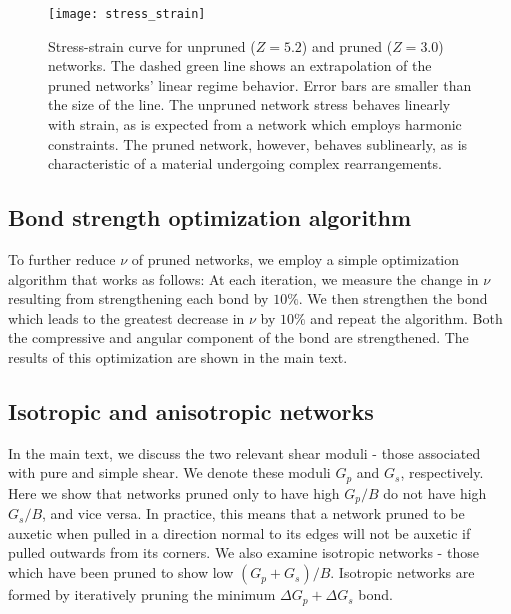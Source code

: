 \documentclass[9pt,twocolumn,twoside]{pnas-new}
\begin{document}
 \begin{figure}
	\centering
	\texttt{[image: stress\_strain]}
	\caption{Stress-strain curve for unpruned ($Z=5.2$) and pruned ($Z=3.0$)  networks.  The dashed green line shows an extrapolation of the pruned networks' linear regime behavior. Error bars are smaller than the size of the line.  The unpruned network stress behaves linearly with strain, as is expected from a network which employs harmonic constraints.  The pruned network, however, behaves sublinearly, as is characteristic of a material undergoing complex rearrangements.}
	\label{fig:stress_strain}
\end{figure}

 \subsection*{Bond strength optimization algorithm}

To further reduce $\nu$ of pruned networks, we employ a simple optimization algorithm that works as follows:  At each iteration, we measure the change in $\nu$ resulting from strengthening each bond by $10\%$.  We then strengthen the bond which leads to the greatest decrease in $\nu$ by $10\%$ and repeat the algorithm.  Both the compressive and angular component of the bond are strengthened.  The results of this optimization are shown in the main text.
 
 \subsection*{Isotropic and anisotropic networks}
 
 In the main text, we discuss the two relevant shear moduli - those associated with pure and simple shear.  We denote these moduli $G_{p}$ and $G_{s}$, respectively. Here we show that networks pruned only to have high $G_{p}/B$ do not have high $G_{s}/B$, and vice versa.  In practice, this means that a network pruned to be auxetic when pulled in a direction normal to its edges will not be auxetic if pulled outwards from its corners.  We also examine isotropic networks - those which have been pruned to show low $(G_{p} + G_{s})/B$.  Isotropic networks are formed by iteratively pruning the minimum $\Delta G_{p} + \Delta G_{s}$ bond.
\end{document}
